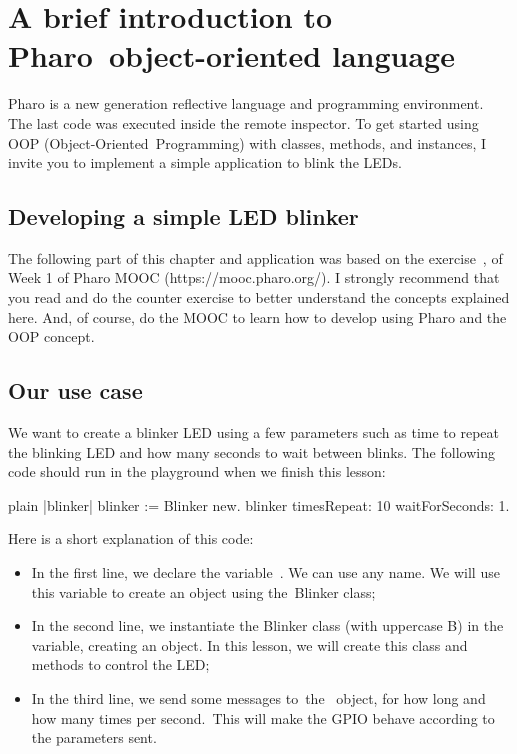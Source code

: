 \documentclass[10pt,twoside,english]{_support/latex/sbabook/sbabook}
\begin{document}
\frontmatter
\pagestyle{plain}

\tableofcontents*
\clearpage\listoffigures

\mainmatter

\chapter{A brief introduction to Pharo object-oriented language}
Pharo is a new generation reflective language and programming environment. The last code was executed inside the remote inspector. To get started using OOP (Object-Oriented Programming) with classes, methods, and instances, I invite you to implement a simple application to blink the LEDs.
\section{Developing a simple LED blinker}
The following part of this chapter and application was based on the exercise , of Week 1 of Pharo MOOC (https://mooc.pharo.org/). I strongly recommend that you read and do the counter exercise to better understand the concepts explained here. And, of course, do the MOOC to learn how to develop using Pharo and the OOP concept.
\section{Our use case}
We want to create a blinker LED using a few parameters such as time to repeat the blinking LED and how many seconds to wait between blinks. The following code should run in the playground when we finish this lesson:

\begin{displaycode}{plain}
|blinker|
blinker := Blinker new.
blinker timesRepeat: 10 waitForSeconds: 1.
\end{displaycode}

Here is a short explanation of this code:

\begin{itemize}
\item In the first line, we declare the variable . We can use any name. We will use this variable to create an object using the Blinker class;
\item In the second line, we instantiate the Blinker class (with uppercase B) in the  variable, creating an object. In this lesson, we will create this class and methods to control the LED;
\item In the third line, we send some messages to the  object, for how long and how many times per second. This will make the GPIO behave according to the parameters sent.
\end{itemize}
\end{document}
